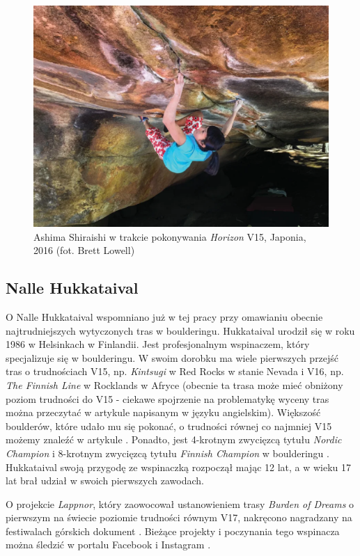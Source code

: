 \documentclass{article}
\begin{document}
\begin{figure}[!htbp]
	\begin{center}
		\includegraphics[width=0.6\linewidth]{images/ashima.eps}
	\end{center}
	\caption{Ashima Shiraishi w trakcie pokonywania \textit{Horizon} V15, Japonia, 2016 (fot. Brett Lowell) \cite{climb-ashima}}
	\label{ashima-horizon}
\end{figure}

\subsection{Nalle Hukkataival}
\label{nh}
O Nalle Hukkataival wspomniano już w tej pracy przy omawianiu obecnie najtrudniejszych wytyczonych tras w boulderingu. Hukkataival urodził się w roku 1986 w Helsinkach w Finlandii. Jest profesjonalnym wspinaczem, który specjalizuje się w boulderingu. W swoim dorobku ma wiele pierwszych przejść tras o trudnościach V15, np. \textit{Kintsugi} w Red Rocks w stanie Nevada \cite{kintsugi} i V16, np. \textit{The Finnish Line} w Rocklands w Afryce \cite{finnish-line} (obecnie ta trasa może mieć obniżony poziom trudności do V15 - ciekawe spojrzenie na problematykę wyceny tras można przeczytać w artykule \cite{climb-hukka} napisanym w języku angielskim). Większość boulderów, które udało mu się pokonać, o trudności równej co najmniej V15 możemy znaleźć w artykule \cite{hardest}. Ponadto, jest 4-krotnym zwycięzcą tytułu \textit{Nordic Champion} i 8-krotnym zwycięzcą tytułu \textit{Finnish Champion} w boulderingu \cite{wiki-hukka}. Hukkataival swoją przygodę ze wspinaczką rozpoczął mając 12 lat, a w wieku 17 lat brał udział w swoich pierwszych zawodach.  

O projekcie \textit{Lappnor}, który zaowocował ustanowieniem trasy \textit{Burden of Dreams} o pierwszym na świecie poziomie trudności równym V17, nakręcono nagradzany na festiwalach górskich dokument \cite{docu-lappnor}. Bieżące projekty i poczynania tego wspinacza można śledzić w portalu Facebook \cite{hukka-fb} i Instagram \cite{hukka-ig}.
\end{document}
